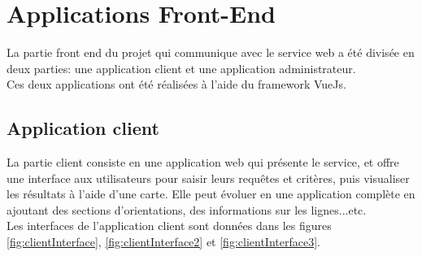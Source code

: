 \section{Applications Front-End}
\label{ref:Implementation}

La partie front end du projet qui communique avec le service web a été divisée en deux parties: une application client et une application administrateur.\\
Ces deux applications ont été réalisées à l'aide du framework VueJs.
\subsection{Application client}

La partie client consiste en une application web qui présente le service, et offre une interface aux utilisateurs pour saisir leurs requêtes et critères, puis visualiser les résultats à l'aide d'une carte.
Elle peut évoluer en une application complète en ajoutant des sections d'orientations, des informations sur les lignes...etc.\\
Les interfaces de l'application client sont données dans les figures \ref{fig:clientInterface}, \ref{fig:clientInterface2} et \ref{fig:clientInterface3}.

